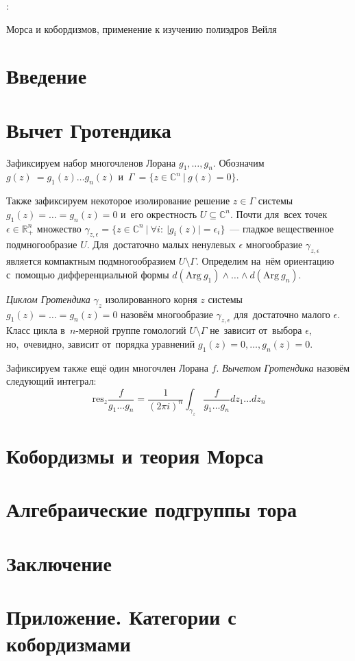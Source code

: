 \documentclass{article}
\begin{document}

\begin{titlepage}
  \centering

  {:\vspace{0.2cm}}\par
  { Морса и кобордизмов, применение к изучению полиэдров Вейля}
\end{titlepage}

\tableofcontents

\section{Введение}

\section{Вычет Гротендика}

Зафиксируем набор многочленов Лорана $g_1, \ldots, g_n$.
Обозначим $g(z)~= g_1(z) \ldots g_n(z)$ и~$\Gamma~= \{ z \in \mathbb{C}^n \ | \ g(z) = 0 \}$.

Также зафиксируем некоторое изолирование решение $z \in \Gamma$ системы $g_1(z) = \ldots = g_n(z) = 0$ и~его окрестность $U \subseteq \mathbb{C}^n$.
Почти для~всех точек $\epsilon \in \mathbb{R}_{+}^n$ множество $\gamma_{z, \epsilon} = \{ z \in \mathbb{C}^n \ | \ \forall i{:}\ |g_i(z)| = \epsilon_i \}$~—
гладкое вещественное подмногообразие $U$. Для~достаточно малых ненулевых $\epsilon$ многообразие $\gamma_{z, \epsilon}$ является компактным
подмногообразием $U \setminus \Gamma$. Определим на~нём ориентацию с~помощью дифференциальной формы $d(\mathrm{Arg}\ g_1) \wedge \ldots \wedge d(\mathrm{Arg}\ g_n)$.

\textit{Циклом Гротендика} $\gamma_z$ изолированного корня $z$ системы $g_1(z) = \ldots = g_n(z) = 0$ назовём многообразие $\gamma_{z, \epsilon}$ для~достаточно малого $\epsilon$.
Класс цикла в~$n$-мерной группе гомологий $U \setminus \Gamma$ не~зависит от~выбора $\epsilon$, но,~очевидно, зависит от~порядка уравнений $g_1(z) = 0, \ldots, g_n(z) = 0$.

Зафиксируем также ещё один многочлен Лорана $f$. \textit{Вычетом Гротендика} назовём следующий интеграл:
$$
  \mathrm{res}_{z} \frac{f}{g_1 \ldots g_n} = \frac{1}{(2 \pi i)^n} \int_{\gamma_z} \frac{f}{g_1 \ldots g_n} dz_1 \ldots dz_n
$$

\section{Кобордизмы и теория Морса}

\section{Алгебраические подгруппы тора}

\section{Заключение}

\section{Приложение. Категории с кобордизмами}
\end{document}
